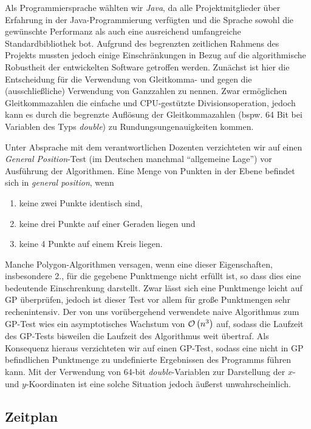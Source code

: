     Als Programmiersprache wählten wir \emph{Java}, da alle Projektmitglieder
    über Erfahrung in der Java-Programmierung verfügten und die Sprache sowohl
    die gewünschte Performanz als auch eine ausreichend umfangreiche
    Standardbibliothek bot. Aufgrund des begrenzten zeitlichen Rahmens des
    Projekts mussten jedoch einige Einschränkungen in Bezug auf die
    algorithmische Robustheit der entwickelten Software getroffen werden.
    Zunächst ist hier die Entscheidung für die Verwendung von Gleitkomma- und
    gegen die (ausschließliche) Verwendung von Ganzzahlen zu nennen. Zwar
    ermöglichen Gleitkommazahlen die einfache und CPU-gestützte
    Divisionsoperation, jedoch kann es durch die begrenzte Auflösung der
    Gleitkommazahlen (bspw. 64 Bit bei Variablen des Typs \emph{double}) zu
    Rundungsungenauigkeiten kommen.

    Unter Absprache mit dem verantwortlichen Dozenten verzichteten wir auf einen
    \emph{General Position}-Test (im Deutschen manchmal \enquote{allgemeine
    Lage}) vor Ausführung der Algorithmen. Eine Menge von Punkten in der Ebene
    befindet sich in \emph{general position}, wenn

    \begin{enumerate}
      \item keine zwei Punkte identisch sind,
      \item keine drei Punkte auf einer Geraden liegen und
      \item keine 4 Punkte auf einem Kreis liegen.
    \end{enumerate}

    Manche Polygon-Algorithmen versagen, wenn eine dieser Eigenschaften,
    insbesondere 2., für die gegebene Punktmenge nicht erfüllt ist, so dass dies eine bedeutende Einschrenkung darstellt. Zwar lässt
    sich eine Punktmenge leicht auf GP überprüfen, jedoch ist dieser Test vor
    allem für große Punktmengen sehr rechenintensiv. Der von uns vorübergehend
    verwendete naive Algorithmus zum GP-Test wies ein asymptotisches Wachstum
    von $\mathcal{O}\left(n^3\right)$ auf, sodass die Laufzeit des GP-Tests bisweilen
    die Laufzeit des Algorithmus weit übertraf. Als Konsequenz hieraus
    verzichteten wir auf einen GP-Test, sodass eine nicht in GP befindlichen
    Punktmenge zu undefinierte Ergebnissen des Programms führen kann. Mit der
    Verwendung von 64-bit \emph{double}-Variablen zur Darstellung der $x$- und
    $y$-Koordinaten ist eine solche Situation jedoch äußerst unwahrscheinlich.

  \subsection{Zeitplan}

